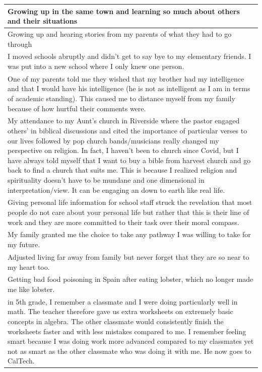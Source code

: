 \documentclass[
  .7em,
  letterpaper,
  DIV=11,
  numbers=noendperiod]{scrartcl}
\begin{document}
\begin{table}
\begin{tabular}{l}
\hline
Growing up in the same town and learning so much about others and their situations\\
\hline
Growing up and hearing stories from my parents of what they had to go through\\
\hline
I moved schools abruptly and didn't get to say bye to my elementary friends. I was put into a new school where I only knew one person.\\
\hline
One of my parents told me they wished that my brother had my intelligence and that I would have his intelligence (he is not as intelligent as I am in terms of academic standing). This caused me to distance myself from my family because of how hurtful their comments were.\\
\hline
My attendance to my Aunt's church in Riverside where the pastor engaged others' in biblical discussions and cited the importance of particular verses to our lives followed by pop church bands/musicians really changed my perspective on religion. In fact, I haven't been to church since Covid, but I have always told myself that I want to buy a bible from harvest church and go back to find a church that suits me. This is because I realized religion and spirituality doesn't have to be mundane and one dimensional in interpretation/view. It can be engaging an down to earth like real life.\\
\hline
Giving personal life information for school staff struck the revelation that most people do not care about your personal life but rather that this is their line of work and they are more committed to their task over their moral compass.\\
\hline
My family granted me the choice to take any pathway I was willing to take for my future.\\
\hline
Adjusted living far away from family but never forget that they are so near to my heart too.\\
\hline
Getting bad food poisoning in Spain after eating lobster, which no longer made me like lobster.\\
\hline
in 5th grade, I remember a classmate and I were doing particularly well in math. The teacher therefore gave us extra worksheets on extremely basic concepts in algebra. The other classmate would consistently finish the worksheets faster and with less mistakes compared to me. I remember feeling smart because I was doing work more advanced compared to my classmates yet not as smart as the other classmate who was doing it with me. He now goes to CalTech.\\

\end{tabular}
\end{table}
\end{document}

